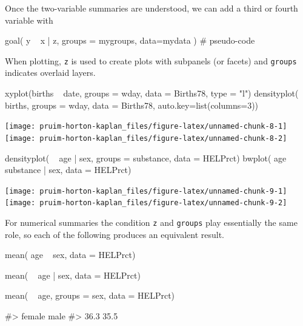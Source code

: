 Once the two-variable summaries are understood, we can add a third or
fourth variable with

\begin{Schunk}
\begin{Sinput}
goal( y ~ x | z, groups = mygroups, data=mydata )    # pseudo-code
\end{Sinput}
\end{Schunk}

\noindent
When plotting, \texttt{z} is used to create plots with subpanels (or
facets) and \texttt{groups} indicates overlaid layers.

\begin{Schunk}
\begin{Sinput}
xyplot(births ~ date, groups = wday, data = Births78, type = "l")
densityplot( ~ births, groups = wday, data = Births78, auto.key=list(columns=3))
\end{Sinput}


\begin{center}\texttt{[image: pruim-horton-kaplan\_files/figure-latex/unnamed-chunk-8-1]} \texttt{[image: pruim-horton-kaplan\_files/figure-latex/unnamed-chunk-8-2]} \end{center}

\end{Schunk}\begin{Schunk}
\begin{Sinput}
densityplot( ~ age | sex, groups = substance, data = HELPrct)
bwplot( age ~ substance | sex, data = HELPrct)
\end{Sinput}


\begin{center}\texttt{[image: pruim-horton-kaplan\_files/figure-latex/unnamed-chunk-9-1]} \texttt{[image: pruim-horton-kaplan\_files/figure-latex/unnamed-chunk-9-2]} \end{center}

\end{Schunk}

For numerical summaries the condition \texttt{z} and \texttt{groups}
play essentially the same role, so each of the following produces an
equivalent result.

\begin{Schunk}
\begin{Sinput}
mean( age ~ sex, data = HELPrct)
\end{Sinput}
\end{Schunk}\begin{Schunk}
\begin{Sinput}
mean( ~ age | sex, data = HELPrct)
\end{Sinput}
\end{Schunk}\begin{Schunk}
\begin{Sinput}
mean( ~ age, groups = sex, data = HELPrct)
\end{Sinput}
\begin{Soutput}
#> female   male 
#>   36.3   35.5
\end{Soutput}
\end{Schunk}

